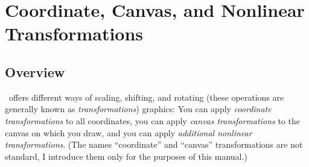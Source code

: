 %
%
%


\section[base-transformations]{Coordinate, Canvas, and Nonlinear Transformations}

\subsection{Overview}

\pgfname\ offers different ways of scaling, shifting, and rotating (these
operations are generally known as \emph{transformations}) graphics: You can
apply \emph{coordinate transformations} to all coordinates, you can apply
\emph{canvas transformations} to the canvas on which you draw, and you can
apply \emph{additional nonlinear transformations}. (The names ``coordinate''
and ``canvas'' transformations are not standard, I introduce them only for the
purposes of this manual.)

